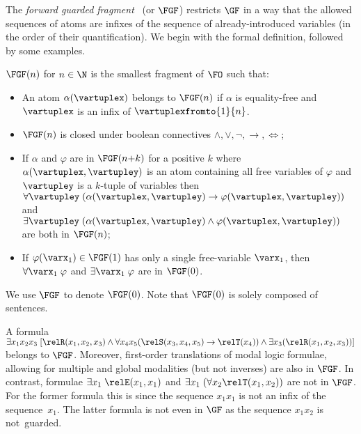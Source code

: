 The \emph{forward guarded fragment}~\cite[Sec. 3.1]{Bednarczyk21} (or $\FGF$) restricts $\GF$ in a way that the allowed sequences of atoms are infixes of the sequence of already-introduced variables (in the order of their quantification).
We begin with the formal definition, followed by some examples.
\begin{definition}
  $\FGF(n)$ for $n \in \N$ is the smallest fragment of $\FO$ such that:
  \begin{itemize}\itemsep0em
      \item An atom $\alpha(\vartuplex)$ belongs to $\FGF(n)$ if $\alpha$ is equality-free and $\vartuplex$ is an infix of $\vartuplexfromto{1}{n}$.
      \item $\FGF(n)$ is closed under boolean connectives $\land, \lor, \neg, \to, \iff$;
      \item If $\alpha$ and $\varphi$ are in $\FGF(n{+}k)$ for a positive $k$ where $\alpha(\vartuplex, \vartupley)$ is an atom containing all free variables of $\varphi$ and $\vartupley$ is a $k$-tuple of variables then $\forall{\vartupley} \; (\alpha(\vartuplex, \vartupley) \to \varphi(\vartuplex, \vartupley))$ and $\exists{\vartupley} \; (\alpha(\vartuplex, \vartupley) \land \varphi(\vartuplex, \vartupley))$ are both in $\FGF(n)$;
      \item If $\varphi(\varx_1) \in \FGF(1)$ has only a single free-variable $\varx_1$, then $\forall{\varx_1}\; \varphi$ and $\exists{\varx_1}\; \varphi$ are in $\FGF(0)$.
  \end{itemize}
\end{definition}
We use $\FGF$ to denote $\FGF(0)$. Note that $\FGF(0)$ is solely composed of sentences.

\begin{example}
A formula $\exists{x_1x_{2}x_{3}}\; [\relR(x_{1}, x_{2}, x_{3}) \land \forall{x_{4}x_{5}}(\relS(x_{3}, x_{4}, x_{5}) \to \relT(x_{4})) \land \exists{x_{3}}(\relR(x_{1}, x_{2}, x_{3}))]$ belongs to $\FGF$.
Moreover, first-order translations of modal logic formulae, allowing for multiple and global modalities (but not inverses) are also in $\FGF$.
In contrast, formulae $\exists{x_{1}}\; \relE(x_{1}, x_{1})$ and $\exists{x_{1}}\; (\forall{x_{2}} \relT(x_{1}, x_{2}))$ are not in $\FGF$.
For the former formula this is since the sequence $x_1x_1$ is not an infix of the sequence~$x_1$.
The latter formula is not even in $\GF$ as the sequence $x_{1}x_{2}$ is not~guarded.
\end{example}
